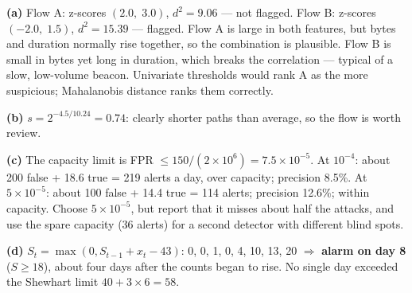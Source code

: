 \documentclass[11pt]{article}
\begin{document}
\begin{soln}\textbf{(a)} Flow A: z-scores $(2.0,\;3.0)$, $d^2=\mathbf{9.06}$ --- not flagged. Flow B: z-scores $(-2.0,\;1.5)$, $d^2=\mathbf{15.39}$ --- flagged. Flow A is large in both features, but bytes and duration normally rise together, so the combination is plausible. Flow B is small in bytes yet long in duration, which breaks the correlation --- typical of a slow, low-volume beacon. Univariate thresholds would rank A as the more suspicious; Mahalanobis distance ranks them correctly.

\textbf{(b)} $s=2^{-4.5/10.24}=\mathbf{0.74}$: clearly shorter paths than average, so the flow is worth review.

\textbf{(c)} The capacity limit is FPR $\le150/(2\times10^6)=7.5\times10^{-5}$. At $10^{-4}$: about 200 false + 18.6 true = 219 alerts a day, over capacity; precision 8.5\%. At $5\times10^{-5}$: about 100 false + 14.4 true = 114 alerts; precision 12.6\%; within capacity. Choose $5\times10^{-5}$, but report that it misses about half the attacks, and use the spare capacity (36 alerts) for a second detector with different blind spots.

\textbf{(d)} $S_t=\max(0,S_{t-1}+x_t-43)$: 0, 0, 1, 0, 4, 10, 13, 20 $\Rightarrow$ \textbf{alarm on day 8} ($S\ge18$), about four days after the counts began to rise. No single day exceeded the Shewhart limit $40+3\times6=58$.\end{soln}
\end{document}
